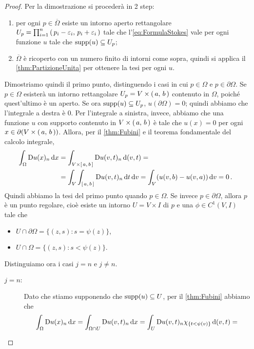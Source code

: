 \begin{proof}
	Per la dimostrazione si procederà in 2 step:
	\begin{enumerate}
		\item per ogni $p\in \overline\Omega$ esiste un intorno aperto rettangolare $U_p=\prod_{i=1}^n \left(\,p_i-\varepsilon_i,\,p_i+\varepsilon_i\,\right)$
			tale che l'\cref{eq:FormulaStokes} vale per ogni funzione $u$ tale che $\operatorname{supp}(u)\subseteq U_p$;
		\item $\overline\Omega$ è ricoperto con un numero finito di intorni come sopra, quindi si applica il \cref{thm:PartizioneUnita} per ottenere
			la tesi per ogni $u$.
	\end{enumerate}
	
	Dimostriamo quindi il primo punto, distinguendo i casi in cui $p\in \Omega$ e $p\in \partial \Omega$.
	Se $p\in \Omega$ esisterà un intorno rettangolare $U_p=V\times \left(\,a,\,b\,\right)$ contenuto in $\Omega$, poiché quest'ultimo è un aperto. Se ora $\operatorname{supp}(u)\subseteq U_p$,
	$u(\partial \Omega)=0$; quindi abbiamo che l'integrale a destra è $0$. Per l'integrale a sinistra, invece, abbiamo che una funzione $u$
	con supporto contenuto in $V\times \left(\,a,\,b\,\right)$ è tale che $u(x)=0$ per ogni
	$x\in \partial (V\times \left(\,a,\,b\,\right))$. Allora, per il \cref{thm:Fubini} e il teorema fondamentale del calcolo integrale,
	\begin{align*}
		\int_{\Omega} \mathrm D u(x)_n \,\mathrm d x &= \int_{V\times \left[\,a,\,b\,\right]} \mathrm D u(v,t)_n \,\mathrm d (v,t) = \\
		& = \int_V \int_{\left[\,a,\,b\,\right]} \mathrm D u(v,t)_n \,\mathrm d t \,\mathrm d v = \int_V (u(v,b) - u(v,a)) \,\mathrm d v = 0\, \text{. }
	\end{align*}
	Quindi abbiamo la tesi del primo punto quando $p\in\Omega$. Se invece $p\in \partial \Omega$, allora $p$ è un punto regolare, cioè esiste
	un intorno $U=V\times I$ di $p$ e una $\phi\in C^1(V,I)$ tale che
	\begin{itemize}
		\item $U\cap \partial \Omega = \{(z,s):s=\psi(z)\}$,
		\item $U\cap \Omega = \{(z,s):s<\psi(z)\}$.
	\end{itemize}
	Distinguiamo ora i casi $j=n$ e $j\neq n$.
	\begin{description}
		\item [$j=n$:] Dato che stiamo supponendo che $\operatorname{supp}(u)\subseteq U$, per il \cref{thm:Fubini} abbiamo che
			\begin{align*}
				\int_{\Omega} \Diff u(x)_n \de x  &= \int_{\Omega\cap U} \Diff u(v,t)_n\de x =
				\int_{U} \Diff u(v,t)_n \chi_{\{t<\psi(v)\}} \de (v,t) = \\

\end{align*}
\end{description}
\end{proof}
